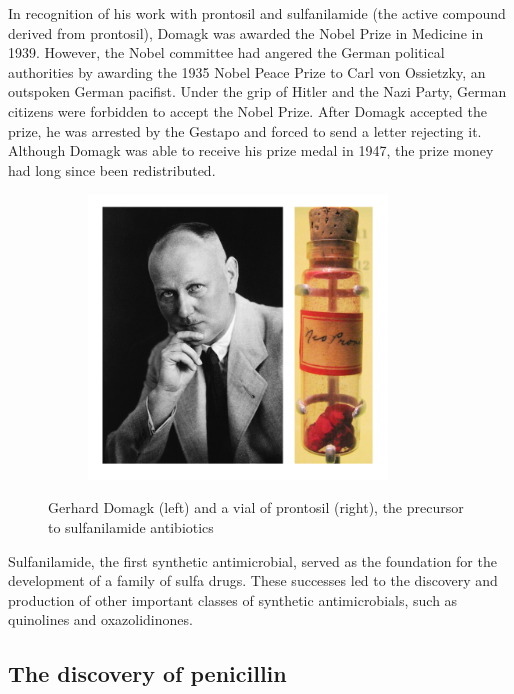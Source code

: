 \documentclass[
  letterpaper,
  DIV=11,
  numbers=noendperiod]{scrreprt}
\begin{document}
In recognition of his work with prontosil and sulfanilamide (the active
compound derived from prontosil), Domagk was awarded the Nobel Prize in
Medicine in 1939. However, the Nobel committee had angered the German
political authorities by awarding the 1935 Nobel Peace Prize to Carl von
Ossietzky, an outspoken German pacifist. Under the grip of Hitler and
the Nazi Party, German citizens were forbidden to accept the Nobel
Prize. After Domagk accepted the prize, he was arrested by the Gestapo
and forced to send a letter rejecting it. Although Domagk was able to
receive his prize medal in 1947, the prize money had long since been
redistributed.

\begin{figure}

{\centering 

\begin{figure}

{\centering \includegraphics[width=3.125in,height=\textheight]{images/domagk.png}

}

\end{figure}

}

\caption{\label{fig-domagk}Gerhard Domagk (left) and a vial of prontosil
(right), the precursor to sulfanilamide antibiotics}

\end{figure}

Sulfanilamide, the first synthetic antimicrobial, served as the
foundation for the development of a family of sulfa drugs. These
successes led to the discovery and production of other important classes
of synthetic antimicrobials, such as quinolines and oxazolidinones.

\hypertarget{the-discovery-of-penicillin}{%
\subsection{The discovery of
penicillin}\label{the-discovery-of-penicillin}}
\end{document}
